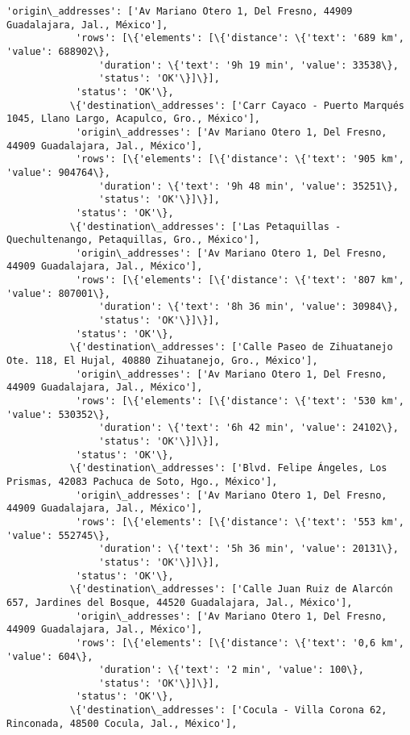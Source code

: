 \documentclass[11pt]{article}
\begin{document}
\begin{Verbatim}[commandchars=\\\{\}]
            'origin\_addresses': ['Av Mariano Otero 1, Del Fresno, 44909 Guadalajara, Jal., México'],
            'rows': [\{'elements': [\{'distance': \{'text': '689 km', 'value': 688902\},
                'duration': \{'text': '9h 19 min', 'value': 33538\},
                'status': 'OK'\}]\}],
            'status': 'OK'\},
           \{'destination\_addresses': ['Carr Cayaco - Puerto Marqués 1045, Llano Largo, Acapulco, Gro., México'],
            'origin\_addresses': ['Av Mariano Otero 1, Del Fresno, 44909 Guadalajara, Jal., México'],
            'rows': [\{'elements': [\{'distance': \{'text': '905 km', 'value': 904764\},
                'duration': \{'text': '9h 48 min', 'value': 35251\},
                'status': 'OK'\}]\}],
            'status': 'OK'\},
           \{'destination\_addresses': ['Las Petaquillas - Quechultenango, Petaquillas, Gro., México'],
            'origin\_addresses': ['Av Mariano Otero 1, Del Fresno, 44909 Guadalajara, Jal., México'],
            'rows': [\{'elements': [\{'distance': \{'text': '807 km', 'value': 807001\},
                'duration': \{'text': '8h 36 min', 'value': 30984\},
                'status': 'OK'\}]\}],
            'status': 'OK'\},
           \{'destination\_addresses': ['Calle Paseo de Zihuatanejo Ote. 118, El Hujal, 40880 Zihuatanejo, Gro., México'],
            'origin\_addresses': ['Av Mariano Otero 1, Del Fresno, 44909 Guadalajara, Jal., México'],
            'rows': [\{'elements': [\{'distance': \{'text': '530 km', 'value': 530352\},
                'duration': \{'text': '6h 42 min', 'value': 24102\},
                'status': 'OK'\}]\}],
            'status': 'OK'\},
           \{'destination\_addresses': ['Blvd. Felipe Ángeles, Los Prismas, 42083 Pachuca de Soto, Hgo., México'],
            'origin\_addresses': ['Av Mariano Otero 1, Del Fresno, 44909 Guadalajara, Jal., México'],
            'rows': [\{'elements': [\{'distance': \{'text': '553 km', 'value': 552745\},
                'duration': \{'text': '5h 36 min', 'value': 20131\},
                'status': 'OK'\}]\}],
            'status': 'OK'\},
           \{'destination\_addresses': ['Calle Juan Ruiz de Alarcón 657, Jardines del Bosque, 44520 Guadalajara, Jal., México'],
            'origin\_addresses': ['Av Mariano Otero 1, Del Fresno, 44909 Guadalajara, Jal., México'],
            'rows': [\{'elements': [\{'distance': \{'text': '0,6 km', 'value': 604\},
                'duration': \{'text': '2 min', 'value': 100\},
                'status': 'OK'\}]\}],
            'status': 'OK'\},
           \{'destination\_addresses': ['Cocula - Villa Corona 62, Rinconada, 48500 Cocula, Jal., México'],

\end{Verbatim}
\end{document}
